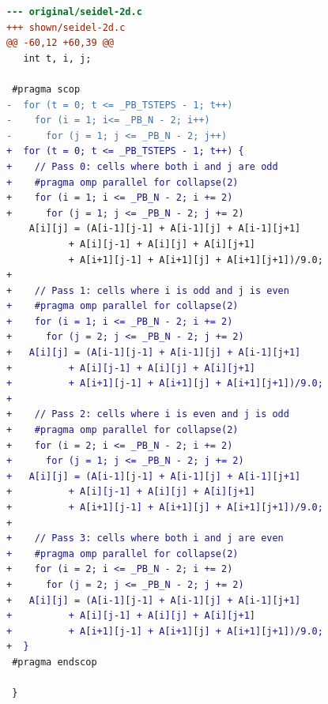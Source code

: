 \begin{lstlisting}[language=diff,basicstyle=\ttfamily\scriptsize,breaklines=true,caption={polybench/seidel-2d — no-change (e10) — shown: a rewrite the gate rejected at 'correctness'}]
--- original/seidel-2d.c
+++ shown/seidel-2d.c
@@ -60,12 +60,39 @@
   int t, i, j;
 
 #pragma scop
-  for (t = 0; t <= _PB_TSTEPS - 1; t++)
-    for (i = 1; i<= _PB_N - 2; i++)
-      for (j = 1; j <= _PB_N - 2; j++)
+  for (t = 0; t <= _PB_TSTEPS - 1; t++) {
+    // Pass 0: cells where both i and j are odd
+    #pragma omp parallel for collapse(2)
+    for (i = 1; i <= _PB_N - 2; i += 2)
+      for (j = 1; j <= _PB_N - 2; j += 2)
 	A[i][j] = (A[i-1][j-1] + A[i-1][j] + A[i-1][j+1]
 		   + A[i][j-1] + A[i][j] + A[i][j+1]
 		   + A[i+1][j-1] + A[i+1][j] + A[i+1][j+1])/9.0;
+
+    // Pass 1: cells where i is odd and j is even
+    #pragma omp parallel for collapse(2)
+    for (i = 1; i <= _PB_N - 2; i += 2)
+      for (j = 2; j <= _PB_N - 2; j += 2)
+	A[i][j] = (A[i-1][j-1] + A[i-1][j] + A[i-1][j+1]
+		   + A[i][j-1] + A[i][j] + A[i][j+1]
+		   + A[i+1][j-1] + A[i+1][j] + A[i+1][j+1])/9.0;
+
+    // Pass 2: cells where i is even and j is odd
+    #pragma omp parallel for collapse(2)
+    for (i = 2; i <= _PB_N - 2; i += 2)
+      for (j = 1; j <= _PB_N - 2; j += 2)
+	A[i][j] = (A[i-1][j-1] + A[i-1][j] + A[i-1][j+1]
+		   + A[i][j-1] + A[i][j] + A[i][j+1]
+		   + A[i+1][j-1] + A[i+1][j] + A[i+1][j+1])/9.0;
+
+    // Pass 3: cells where both i and j are even
+    #pragma omp parallel for collapse(2)
+    for (i = 2; i <= _PB_N - 2; i += 2)
+      for (j = 2; j <= _PB_N - 2; j += 2)
+	A[i][j] = (A[i-1][j-1] + A[i-1][j] + A[i-1][j+1]
+		   + A[i][j-1] + A[i][j] + A[i][j+1]
+		   + A[i+1][j-1] + A[i+1][j] + A[i+1][j+1])/9.0;
+  }
 #pragma endscop
 
 }
\end{lstlisting}
